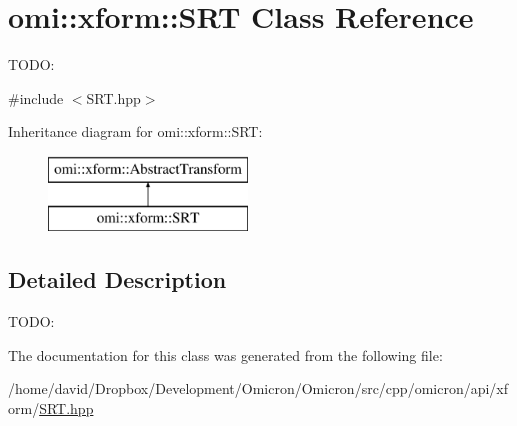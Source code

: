 \hypertarget{classomi_1_1xform_1_1_s_r_t}{}\section{omi\+:\+:xform\+:\+:S\+RT Class Reference}
\label{classomi_1_1xform_1_1_s_r_t}


T\+O\+DO\+:  




{\ttfamily \#include $<$S\+R\+T.\+hpp$>$}

Inheritance diagram for omi\+:\+:xform\+:\+:S\+RT\+:\begin{figure}[H]
\begin{center}
\leavevmode
\includegraphics[height=2.000000cm]{classomi_1_1xform_1_1_s_r_t}
\end{center}
\end{figure}


\subsection{Detailed Description}
T\+O\+DO\+: 

The documentation for this class was generated from the following file\+:\begin{DoxyCompactItemize}
\item 
/home/david/\+Dropbox/\+Development/\+Omicron/\+Omicron/src/cpp/omicron/api/xform/\hyperlink{_s_r_t_8hpp}{S\+R\+T.\+hpp}\end{DoxyCompactItemize}
